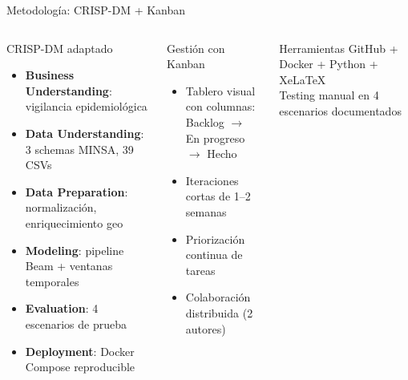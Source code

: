 \documentclass[aspectratio=169, 10pt]{beamer}
\begin{document}
\begin{frame}{Metodolog\'ia: CRISP-DM + Kanban}
  \begin{columns}[c]
      \begin{block}{CRISP-DM adaptado}
        \begin{itemize}\setlength\itemsep{2pt}
          \item \textbf{Business Understanding}: vigilancia epidemiol\'ogica
          \item \textbf{Data Understanding}: 3 schemas MINSA, 39 CSVs
          \item \textbf{Data Preparation}: normalizaci\'on, enriquecimiento geo
          \item \textbf{Modeling}: pipeline Beam + ventanas temporales
          \item \textbf{Evaluation}: 4 escenarios de prueba
          \item \textbf{Deployment}: Docker Compose reproducible
        \end{itemize}
      \end{block}
      \begin{block}{Gesti\'on con Kanban}
        \begin{itemize}\setlength\itemsep{3pt}
          \item Tablero visual con columnas:\\
                Backlog $\to$ En progreso $\to$ Hecho
          \item Iteraciones cortas de 1--2 semanas
          \item Priorizaci\'on continua de tareas
          \item Colaboraci\'on distribuida (2 autores)
        \end{itemize}
      \end{block}
      \vspace{6pt}
      \begin{exampleblock}{Herramientas}
        \small
        GitHub + Docker + Python + XeLaTeX\\
        Testing manual en 4 escenarios documentados
      \end{exampleblock}
  \end{columns}
\end{frame}

\end{document}
